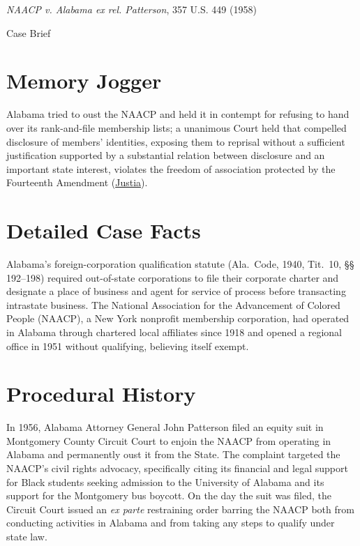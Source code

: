 \documentclass[12pt]{article}
\begin{document}
\begin{center}
{\LARGE \textit{NAACP v. Alabama ex rel. Patterson}, 357 U.S. 449 (1958)\par}
\vspace{0.8em}
{\large Case Brief\par}
\end{center}
\vspace{1em}

\section{Memory Jogger}
Alabama tried to oust the NAACP and held it in contempt for refusing to hand over its rank-and-file membership lists; a unanimous Court held that compelled disclosure of members' identities, exposing them to reprisal without a sufficient justification supported by a substantial relation between disclosure and an important state interest, violates the freedom of association protected by the Fourteenth Amendment (\href{https://supreme.justia.com/cases/federal/us/357/449/}{Justia}).

\section{Detailed Case Facts}
Alabama's foreign-corporation qualification statute (Ala.\ Code, 1940, Tit.\ 10, \S\S\,192--198) required out-of-state corporations to file their corporate charter and designate a place of business and agent for service of process before transacting intrastate business. The National Association for the Advancement of Colored People (NAACP), a New York nonprofit membership corporation, had operated in Alabama through chartered local affiliates since 1918 and opened a regional office in 1951 without qualifying, believing itself exempt.

\section{Procedural History}
In 1956, Alabama Attorney General John Patterson filed an equity suit in Montgomery County Circuit Court to enjoin the NAACP from operating in Alabama and permanently oust it from the State. The complaint targeted the NAACP's civil rights advocacy, specifically citing its financial and legal support for Black students seeking admission to the University of Alabama and its support for the Montgomery bus boycott. On the day the suit was filed, the Circuit Court issued an \textit{ex parte} restraining order barring the NAACP both from conducting activities in Alabama and from taking any steps to qualify under state law.
\end{document}
